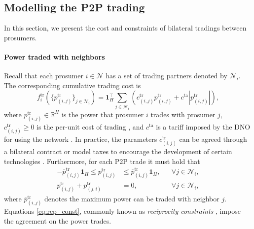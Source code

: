 \documentclass{IEEEtran}  %
\newcommand{\mc}{\mathcal}
\newcommand{\bb}{\mathbb}
\newcommand{\R}{\bb R}
\newcommand{\0}{\mathbf{0}}
\newcommand{\1}{\mathbf{1}}
\begin{document}
\subsection{Modelling the P2P trading}
\label{sec:mod_tr}
 
In this section, we present the cost and constraints of bilateral tradings between prosumers.

\smallskip
\paragraph*{Power traded with neighbors}
Recall that each prosumer $i \in \mc N$ has a set of trading partners denoted by $\mc N_i$. The corresponding cumulative trading cost is 
\begin{equation}
f_{i}^{\mathrm{tr}} \left( \{ p_{(i,j)}^{\mathrm{tr}} \}_{j \in \mc N_i} \right) = 
\1_H^\top \sum_{j\in \mathcal{N}_i} \left(
c_{(i,j)}^{\mathrm{tr}}p_{(i,j)}^{\mathrm{tr}}\!+\! c^{\mathrm{ta}}  |p_{(i,j)}^{\mathrm{tr}}|\right)
,
 \label{eq:f_t}
\end{equation}
where $p_{(i,j)}^{\mathrm{tr}} \in \R^{H}$ is the power that prosumer $i$ trades with prosumer $j$, $c_{(i,j)}^{\mathrm{tr}} \geq 0$ is the per-unit cost of trading \cite{lecadre2020}, and $c^{\mathrm{ta}}$ is a tariff imposed by the DNO for using the network \cite{baroche2019}. In  practice, the parameters $c_{(i,j)}^{\mathrm{tr}}$ can be agreed through a bilateral contract \cite{sousa2019} or model taxes to encourage the development of certain technologies \cite{lecadre2020}. Furthermore, for each P2P trade it must hold that
\begin{subequations}
\begin{align}
-\overline{p}_{(i,j)}^{\mathrm{tr}}\1_H \leq p_{(i,j)}^{\mathrm{tr}} &\leq \overline{p}_{(i,j)}^{\mathrm{tr}}\1_H, & & \forall j\in\mathcal{N}_i, \label{eq:p_t_bound}\\
p_{(i,j)}^{\mathrm{tr}}  + p_{(j,i)}^{\mathrm{tr}}&=0, & & \forall j\in\mathcal{N}_i, \label{eq:rep_const}
\end{align}
\label{eq:ptr_cons}%
\end{subequations}
where $ \overline{p}_{(i,j)}^{\mathrm{tr}}$ denotes the maximum power can be traded with neighbor $j$. Equations \eqref{eq:rep_const}, commonly known as \textit{reciprocity constraints} \cite{sousa2019}, impose the agreement on the power trades.

\end{document}
